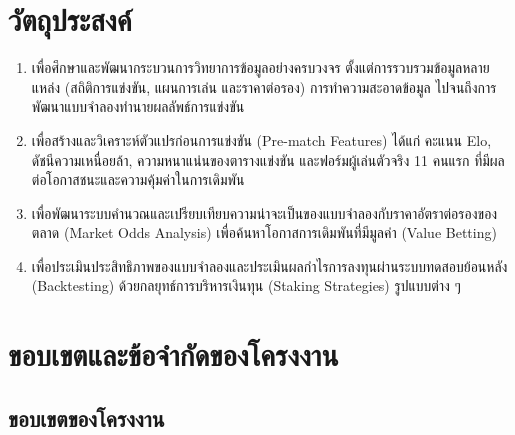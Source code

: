 \section{วัตถุประสงค์}

\begin{enumerate}[label=\arabic*)]
    \item เพื่อศึกษาและพัฒนากระบวนการวิทยาการข้อมูลอย่างครบวงจร ตั้งแต่การรวบรวมข้อมูลหลายแหล่ง (สถิติการแข่งขัน, แผนการเล่น และราคาต่อรอง) การทำความสะอาดข้อมูล ไปจนถึงการพัฒนาแบบจำลองทำนายผลลัพธ์การแข่งขัน
    \item เพื่อสร้างและวิเคราะห์ตัวแปรก่อนการแข่งขัน (Pre-match Features) ได้แก่ คะแนน Elo, ดัชนีความเหนื่อยล้า, ความหนาแน่นของตารางแข่งขัน และฟอร์มผู้เล่นตัวจริง 11 คนแรก ที่มีผลต่อโอกาสชนะและความคุ้มค่าในการเดิมพัน
    \item เพื่อพัฒนาระบบคำนวณและเปรียบเทียบความน่าจะเป็นของแบบจำลองกับราคาอัตราต่อรองของตลาด (Market Odds Analysis) เพื่อค้นหาโอกาสการเดิมพันที่มีมูลค่า (Value Betting)
    \item เพื่อประเมินประสิทธิภาพของแบบจำลองและประเมินผลกำไรการลงทุนผ่านระบบทดสอบย้อนหลัง (Backtesting) ด้วยกลยุทธ์การบริหารเงินทุน (Staking Strategies) รูปแบบต่าง ๆ
\end{enumerate}

\section{ขอบเขตและข้อจำกัดของโครงงาน}

\subsection{ขอบเขตของโครงงาน}


